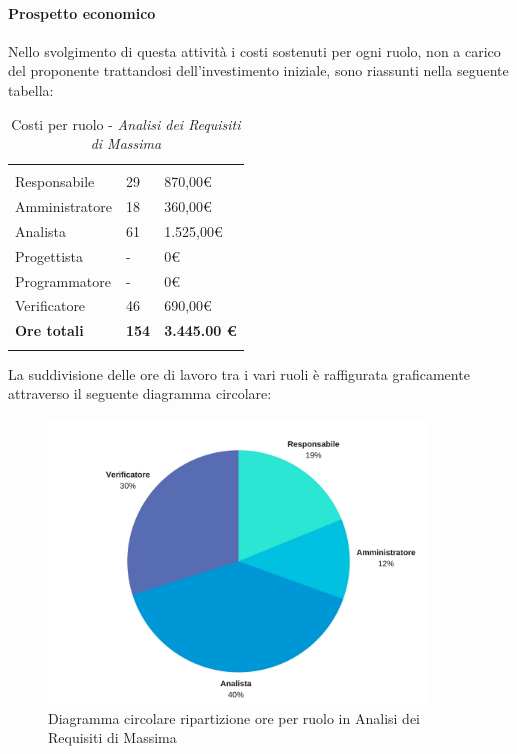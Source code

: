 			\paragraph{Prospetto economico} \Spazio
			Nello svolgimento di questa attività i costi sostenuti per ogni ruolo, non a carico del proponente trattandosi dell'investimento iniziale, sono riassunti nella seguente tabella:
			\begin{table}[H]
				\centering
				\begin{tabular}{p{4cm}|C{4cm}|C{4cm}}
					
					 & &\\
					
					Responsabile & 29 & 870,00\euro \\
					\hline
					Amministratore& 18 & 360,00\euro \\
					\hline
					Analista & 61 & 1.525,00\euro \\
					\hline
					Progettista & - & 0\euro \\
					\hline
					Programmatore & - & 0\euro \\
					\hline
					Verificatore & 46 & 690,00\euro \\
					\hline				
					\textbf{Ore totali} & \textbf{154} & \textbf{3.445.00 \euro} \\
				\end{tabular}
				\caption{Costi per ruolo - \textit{Analisi dei Requisiti di Massima}}
			\end{table}

			
			La suddivisione delle ore di lavoro tra i vari ruoli è raffigurata graficamente attraverso il seguente diagramma circolare:
			\begin{figure}[h] 
			\centering 
				\includegraphics[width=0.9\textwidth]{images/CircolareAnalisiRequisitiDiMassima.jpg} 
				\caption{Diagramma circolare ripartizione ore per ruolo in Analisi dei Requisiti di Massima}
			\label{CircolareAnalisiRequisitiDiMassima}
			\end{figure}

